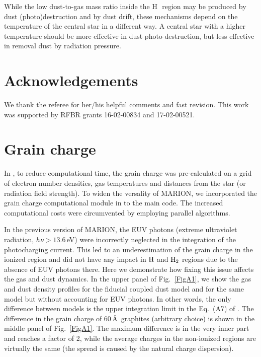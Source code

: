 \documentclass[a4paper,fleqn,usenatbib]{mnras}
\newcommand{\hii}    {H\,{\sc{ii}}~}
\begin{document}
While the low dust-to-gas mass ratio inside the \hii region may be produced by dust (photo)destruction and by dust drift, these mechanisms depend on the temperature of the central star in a different way. A central star with a higher temperature should be more effective in dust photo-destruction, but less effective in removal dust by radiation pressure.

\vspace{-0.5cm} 
\section*{Acknowledgements}
We thank the referee for her/his helpful comments and fast revision. This work was supported by RFBR grants 16-02-00834 and 17-02-00521.

\vspace{-0.5cm} 



\vspace{-0.5cm} 

\appendix
\section{Grain charge} \label{AppA}

In , to reduce computational time, the grain charge was pre-calculated on a grid of electron number densities, gas temperatures and distances from the star (or radiation field strength). To widen the versality of MARION, we incorporated the grain charge computational module in to the main code. The increased computational costs were circumvented by employing parallel algorithms.

In the previous version of MARION, the EUV photons (extreme ultraviolet radiation, $h\nu>13.6$\,eV) were incorrectly neglected in the integration of the photocharging current. This led to an underestimation of the grain charge in the ionized region and did not have any impact in $\rm H$ and ${\rm H}_2$ regions due to the absence of EUV photons there. Here we demonstrate how fixing this issue affects the gas and dust dynamics. In the upper panel of Fig.~\ref{FigA1}, we show the gas and dust density profiles for the fiducial coupled dust model and for the same model but without accounting for EUV photons. In other words, the only difference between models is the upper integration limit in the Eq.~(A7) of . The difference in the grain charge of $60$\,\AA~graphites (arbitrary choice) is shown in the middle panel of Fig.~\ref{FigA1}. The maximum difference is in the very inner part and reaches a factor of 2, while the average charges in the non-ionized regions are virtually the same (the spread is caused by the natural charge dispersion).
\end{document}
